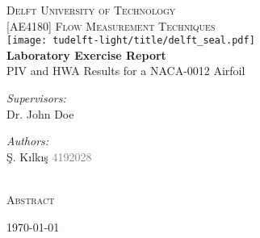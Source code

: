 
\begin{titlepage}
\begin{center}

\textsc{\LARGE Delft University of Technology}\\[0.25cm]
\textsc{\normalsize [AE4180] Flow Measurement Techniques}\\[1.5cm]
\texttt{[image: tudelft-light/title/delft\_seal.pdf]}\\[1.5cm]
{\huge \bfseries Laboratory Exercise Report} \\
\huge  PIV and HWA Results for a NACA-0012 Airfoil \\[1.0cm]

\begin{minipage}[t]{0.4\textwidth}
\begin{flushleft} \large
\emph{Supervisors:}\\
    Dr. John Doe\\
    

\end{flushleft}
\end{minipage}
\begin{minipage}[t]{0.4\textwidth}
\begin{flushright} \large
\emph{Authors:}\\
    \c{S}. K{\i}lk{\i}\c{s} \textcolor{gray}{4192028}\\
    
\end{flushright}
\end{minipage}\\[2.0cm]

\large \textsc{Abstract}

\begin{minipage}[t]{0.8\textwidth} \large



\end{minipage}

\vfill

\small{\today}


\end{center}
\end{titlepage}
\restoregeometry